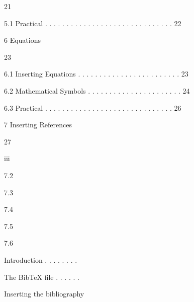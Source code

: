 \documentclass[a4paper,portrait,12pt]{article}
\begin{document}
21


\begin{flushleft}
5.1 Practical . . . . . . . . . . . . . . . . . . . . . . . . . . . . . . 22
\end{flushleft}


\begin{flushleft}
6 Equations
\end{flushleft}


23


\begin{flushleft}
6.1 Inserting Equations . . . . . . . . . . . . . . . . . . . . . . . . 23
\end{flushleft}


\begin{flushleft}
6.2 Mathematical Symbols . . . . . . . . . . . . . . . . . . . . . . 24
\end{flushleft}


\begin{flushleft}
6.3 Practical . . . . . . . . . . . . . . . . . . . . . . . . . . . . . . 26
\end{flushleft}


\begin{flushleft}
7 Inserting References
\end{flushleft}





27


\begin{flushleft}
iii
\end{flushleft}







7.2


7.3


7.4


7.5


7.6





\begin{flushleft}
Introduction . . . . . . . .
\end{flushleft}


\begin{flushleft}
The BibTeX file . . . . . .
\end{flushleft}


\begin{flushleft}
Inserting the bibliography
\end{flushleft}
\end{document}

